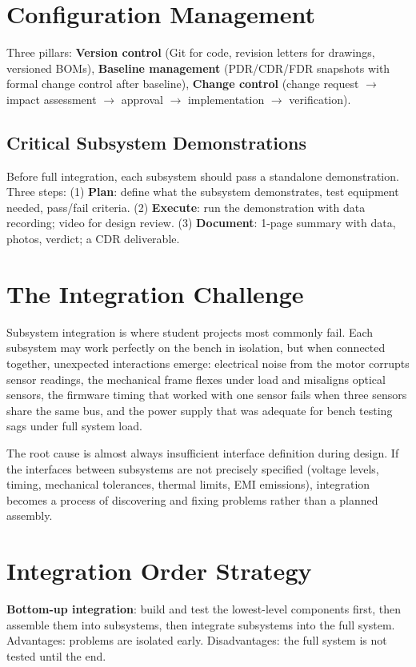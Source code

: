 \section{Configuration Management}
Three pillars: \textbf{Version control} (Git for code, revision letters for drawings, versioned BOMs), \textbf{Baseline management} (PDR/CDR/FDR snapshots with formal change control after baseline), \textbf{Change control} (change request $\to$ impact assessment $\to$ approval $\to$ implementation $\to$ verification).


\subsection{Critical Subsystem Demonstrations}
Before full integration, each subsystem should pass a standalone demonstration. Three steps: (1) \textbf{Plan}: define what the subsystem demonstrates, test equipment needed, pass/fail criteria. (2) \textbf{Execute}: run the demonstration with data recording; video for design review. (3) \textbf{Document}: 1-page summary with data, photos, verdict; a CDR deliverable.

\section{The Integration Challenge}
Subsystem integration is where student projects most commonly fail. Each subsystem may work perfectly on the bench in isolation, but when connected together, unexpected interactions emerge: electrical noise from the motor corrupts sensor readings, the mechanical frame flexes under load and misaligns optical sensors, the firmware timing that worked with one sensor fails when three sensors share the same bus, and the power supply that was adequate for bench testing sags under full system load.

The root cause is almost always insufficient interface definition during design. If the interfaces between subsystems are not precisely specified (voltage levels, timing, mechanical tolerances, thermal limits, EMI emissions), integration becomes a process of discovering and fixing problems rather than a planned assembly.

\section{Integration Order Strategy}
\textbf{Bottom-up integration}: build and test the lowest-level components first, then assemble them into subsystems, then integrate subsystems into the full system. Advantages: problems are isolated early. Disadvantages: the full system is not tested until the end.

